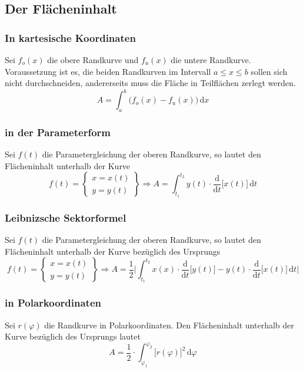 \subsection{Der Flächeninhalt}
\subsubsection{In kartesische Koordinaten}
Sei $f_o\left(x\right)$ die obere Randkurve und $f_u\left(x\right)$ die untere Randkurve. Voraussetzung ist es, die beiden Randkurven im Intervall $a\leq x\leq b$ sollen sich nicht durchschneiden, andererseits muss die Fläche in Teilflächen zerlegt werden.
\begin{equation}
\boxed{A=\displaystyle \int_a^b\Big(f_o\left(x\right)-f_u\left(x\right)\Big)\,\text{d}x}
\end{equation}
\subsubsection{in der Parameterform}
Sei $f\left(t\right)$ die Parametergleichung der oberen Randkurve, so lautet den Flächeninhalt unterhalb der Kurve
\begin{equation}
\boxed{f\left(t\right)=\left\{\begin{matrix}x=x\left(t\right)\\y=y\left(t\right)\end{matrix}\right\}\Longrightarrow A=\displaystyle \int_{t_1}^{t_2}y\left(t\right)\cdot \dfrac{\text{d}}{\text{d}t}\Big[x\left(t\right)\Big]\,\text{d}t}
\end{equation}
\subsubsection{Leibnizsche Sektorformel}
Sei $f\left(t\right)$ die Parametergleichung der oberen Randkurve, so lautet den Flächeninhalt unterhalb der Kurve bezüglich des Ursprungs
\begin{equation}
\boxed{f\left(t\right)=\left\{\begin{matrix}x=x\left(t\right)\\y=y\left(t\right)\end{matrix}\right\}\Longrightarrow A=\dfrac{1}{2}\Big\vert\displaystyle \int_{t_1}^{t_2}x\left(x\right)\cdot \dfrac{\text{d}}{\text{d}t}\Big[y\left(t\right)\Big]-y\left(t\right)\cdot \dfrac{\text{d}}{\text{d}t}\Big[x\left(t\right)\Big]\,\text{d}t\Big\vert}
\end{equation}
\subsubsection{in Polarkoordinaten}
Sei $r\left(\varphi\right)$ die Randkurve in Polarkoordinaten. Den Flächeninhalt unterhalb der Kurve bezüglich des Ursprungs lautet
\begin{equation}
\boxed{A=\dfrac{1}{2}\cdot \displaystyle \int_{\varphi_1}^{\varphi_2}\Big[r\left(\varphi\right)\Big]^2\,\text{d}\varphi}
\end{equation}
